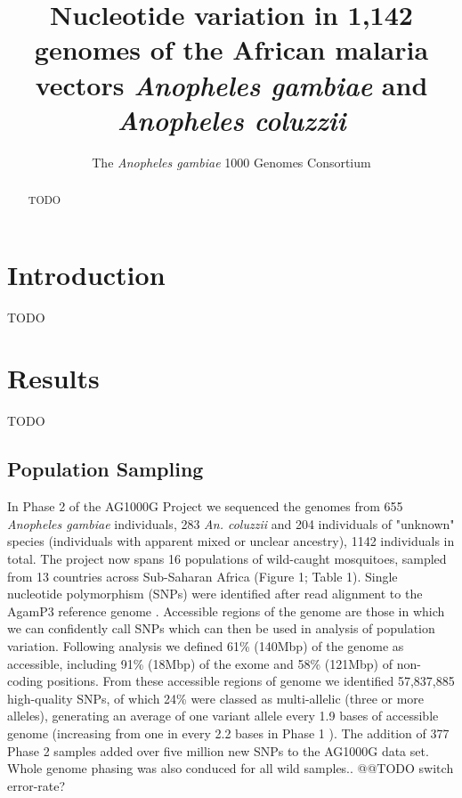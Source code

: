\documentclass[a4paper,11pt,abstracton,hidelinks]{scrartcl}
\title{
Nucleotide variation in 1,142 genomes of the African malaria vectors \emph{Anopheles gambiae} and \emph{Anopheles coluzzii}
}
\author[1]{\small The \emph{Anopheles gambiae} 1000 Genomes Consortium}
\affil[1]{\footnotesize A list of consortium members appears at the end of the paper}
\begin{document}
\maketitle


\begin{abstract}

TODO

\end{abstract}


\section*{Introduction}

TODO


\section*{Results}

TODO

\subsection*{Population Sampling}


%
In Phase 2 of the AG1000G Project we sequenced the genomes from 655 \textit{Anopheles gambiae} individuals, 283 \textit{An. coluzzii} and 204 individuals of "unknown" species (individuals with apparent mixed or unclear ancestry), 1142 individuals in total.
%
The project now spans 16 populations of wild-caught mosquitoes, sampled from 13 countries across Sub-Saharan Africa (Figure 1; Table 1). 
%
Single nucleotide polymorphism (SNPs) were identified after read alignment to the AgamP3 reference genome \cite{Holt2002}.
%
Accessible regions of the genome are those in which we can confidently call SNPs which can then be used in analysis of population variation.
%
Following analysis we defined 61\% (140Mbp) of the genome as accessible, including 91\% (18Mbp) of the exome and 58\% (121Mbp) of non-coding positions.
%
From these accessible regions of genome we identified 57,837,885 high-quality SNPs, of which 24\% were classed as multi-allelic (three or more alleles), generating an average of one variant allele every 1.9 bases of accessible genome (increasing from one in every 2.2 bases in Phase 1 \cite{Ag1000gConsortium2017}). 
%
The addition of 377 Phase 2 samples added over five million new SNPs to the AG1000G data set.
%
Whole genome phasing was also conduced for all wild samples.. @@TODO switch error-rate?
\end{document}
